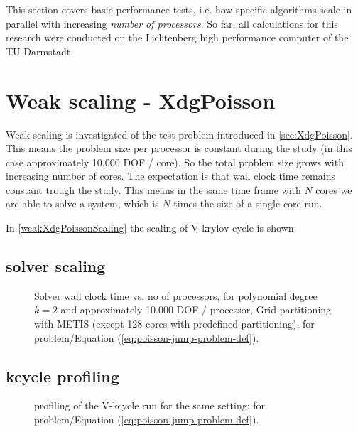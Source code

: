 This section covers basic performance tests, i.e. how specific algorithms scale in parallel with increasing \emph{number of processors}. So far, all calculations for this research were conducted on the Lichtenberg high performance computer of the TU Darmstadt.

\section{Weak scaling - XdgPoisson}
Weak scaling is investigated of the test problem introduced in \ref{sec:XdgPoisson}. This means the problem size per processor is constant during the study (in this case approximately 10.000 DOF / core). So the total problem size grows with increasing number of cores. The expectation is that wall clock time remains constant trough the study. This means in the same time frame with $N$ cores we are able to solve a system, which is $N$ times the size of a single core run.

In \ref{weakXdgPoissonScaling} the scaling of V-krylov-cycle is shown:

\subsection{solver scaling}

\graphicspath{{./apdx-MPISolverPerformance/weakScaling/XdgPoisson/plots/}} 
\begin{figure}[h!]
	\begin{center}
		
	\end{center}
	\caption{
		Solver wall clock time vs. no of processors, for polynomial degree $k=2$ and approximately 10.000 DOF / processor, Grid partitioning with METIS (except 128 cores with predefined partitioning),
		for problem/Equation (\ref{eq:poisson-jump-problem-def}).
	}
	\label{fig:weakXdgPoissonScaling}
\end{figure}

\subsection{kcycle profiling}
\graphicspath{{./apdx-MPISolverPerformance/weakScaling/XdgPoisson/plots/}} 
\begin{figure}[h!]
	\begin{center}
		
	\end{center}
	\caption{
		profiling of the V-kcycle run for the same setting:
		for problem/Equation (\ref{eq:poisson-jump-problem-def}).
	}
	\label{fig:weakXdgPoisson-kcycle-profiling}
\end{figure}


